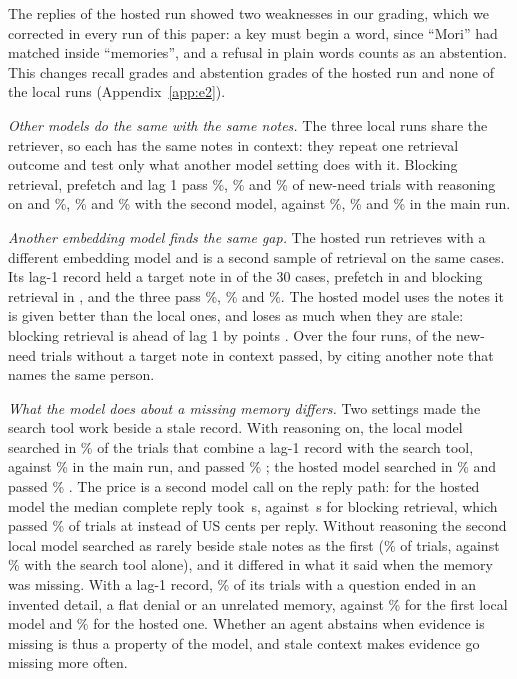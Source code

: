 \documentclass[10pt]{article}
\begin{document}
The replies of the hosted run showed two weaknesses in our grading, which we corrected in every run of this paper: a key must begin a word, since ``Mori'' had matched inside ``memories'', and a refusal in plain words counts as an abstention. This changes \HsRegradedRecall{} recall grades and \HsRegradedAbstain{} abstention grades of the hosted run and none of the local runs (Appendix~\ref{app:e2}).

\emph{Other models do the same with the same notes.} The three local runs share the retriever, so each has the same notes in context: they repeat one retrieval outcome and test only what another model setting does with it. Blocking retrieval, prefetch and lag 1 pass \ThRecBlock\%, \ThRecPre\% and \ThRecLag\% of new-need trials with reasoning on and \QwRecBlock\%, \QwRecPre\% and \QwRecLag\% with the second model, against \RecBlock\%, \RecPre\% and \RecLag\% in the main run.

\emph{Another embedding model finds the same gap.} The hosted run retrieves with a different embedding model and is a second sample of retrieval on the same cases. Its lag-1 record held a target note in \HsGoldCasesLag{} of the 30 cases, prefetch in \HsGoldCasesPre{} and blocking retrieval in \HsGoldCasesBlock{}, and the three pass \HsRecLag\%, \HsRecPre\% and \HsRecBlock\%. The hosted model uses the notes it is given better than the local ones, and loses as much when they are stale: blocking retrieval is ahead of lag 1 by \HsDiffBlockLag{} points \HsDiffBlockLagCI{}. Over the four runs, \AllNoGoldPassed{} of the \AllNoGoldN{} new-need trials without a target note in context passed, by citing another note that names the same person.

\emph{What the model does about a missing memory differs.} Two settings made the search tool work beside a stale record. With reasoning on, the local model searched in \ThSrchHyb\% of the trials that combine a lag-1 record with the search tool, against \SrchHyb\% in the main run, and passed \ThRecHyb\% \ThRecHybCI{}; the hosted model searched in \HsSrchHyb\% and passed \HsRecHyb\% \HsRecHybCI{}. The price is a second model call on the reply path: for the hosted model the median complete reply took \HsReplyHyb\,s, against \HsReplyBlock\,s for blocking retrieval, which passed \HsRecBlock\% of trials at \HsCostBlock{} instead of \HsCostHyb{} US cents per reply. Without reasoning the second local model searched as rarely beside stale notes as the first (\QwSrchHyb\% of trials, against \QwSrchTool\% with the search tool alone), and it differed in what it said when the memory was missing. With a lag-1 record, \QwOtherLag\% of its trials with a question ended in an invented detail, a flat denial or an unrelated memory, against \OtherLag\% for the first local model and \HsOtherLag\% for the hosted one. Whether an agent abstains when evidence is missing is thus a property of the model, and stale context makes evidence go missing more often.
\end{document}
